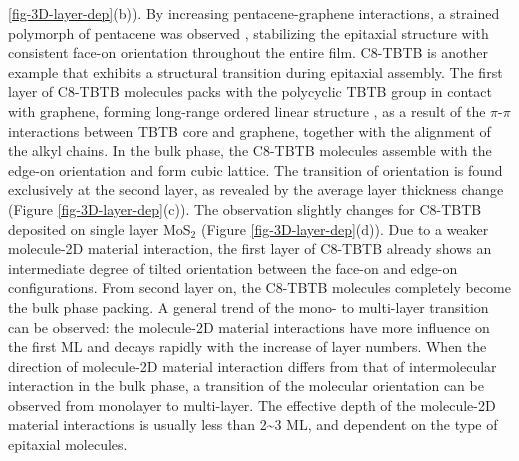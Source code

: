 \ref{fig-3D-layer-dep}(b)). By increasing pentacene-graphene
interactions, a strained polymorph of pentacene was observed
\cite{Kim_2015_pentacene_gr_strain}, stabilizing the epitaxial structure
with consistent face-on orientation throughout the entire
film. C8-TBTB is another example that exhibits a structural transition
during epitaxial assembly. The first layer of C8-TBTB molecules packs
with the polycyclic TBTB group in contact with graphene, forming
long-range ordered linear structure \cite{He_2014_C8BTBT_gr}, as a
result of the \(\pi\)-\(\pi\) interactions between TBTB core and graphene,
together with the alignment of the alkyl chains. In the bulk phase,
the C8-TBTB molecules assemble with the edge-on orientation and form
cubic lattice. The transition of orientation is found exclusively at
the second layer, as revealed by the average layer thickness change
(Figure \ref{fig-3D-layer-dep}(c)). The observation slightly changes for
C8-TBTB deposited on single layer MoS\(_{\text{2}}\) \cite{He_2015_C8BTBT_MoS2}
(Figure \ref{fig-3D-layer-dep}(d)). Due to a weaker molecule-2D material
interaction, the first layer of C8-TBTB already shows an intermediate
degree of tilted orientation between the face-on and edge-on
configurations. From second layer on, the C8-TBTB molecules completely
become the bulk phase packing. A general trend of the mono- to
multi-layer transition can be observed: the molecule-2D material
interactions have more influence on the first ML and decays rapidly
with the increase of layer numbers. When the direction of molecule-2D
material interaction differs from that of intermolecular interaction
in the bulk phase, a transition of the molecular orientation can be
observed from monolayer to multi-layer. The effective depth of the
molecule-2D material interactions is usually less than 2\textasciitilde{}3 ML, and
dependent on the type of epitaxial molecules.

